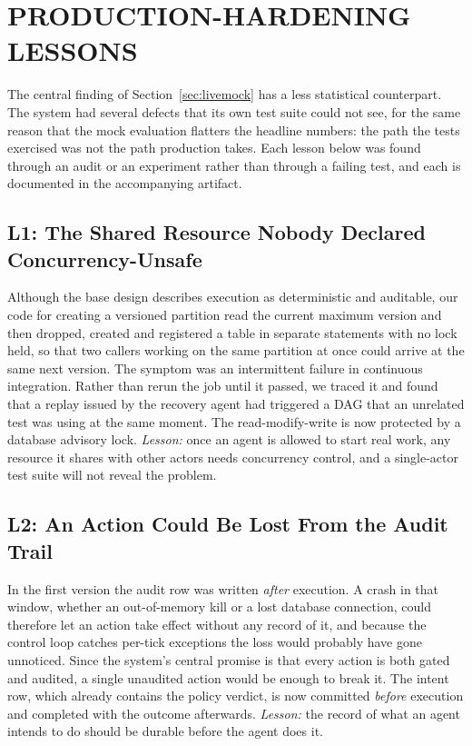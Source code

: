 \section{PRODUCTION-HARDENING LESSONS}\label{sec:lessons}

The central finding of Section~\ref{sec:livemock} has a less statistical counterpart. The system had
several defects that its own test suite could not see, for the same reason that the mock evaluation
flatters the headline numbers: the path the tests exercised was not the path production takes. Each
lesson below was found through an audit or an experiment rather than through a failing test, and each
is documented in the accompanying artifact.

\subsection{L1: The Shared Resource Nobody Declared Concurrency-Unsafe}\label{sec:l1}
Although the base design describes execution as deterministic and auditable, our code for creating a
versioned partition read the current maximum version and then dropped, created and registered a
table in separate statements with no lock held, so that two callers working on the same partition at
once could arrive at the same next version. The symptom was an intermittent failure in continuous
integration. Rather than rerun the job until it passed, we traced it and found that a replay issued by
the recovery agent had triggered a DAG that an unrelated test was using at the same moment. The
read-modify-write is now protected by a database advisory lock. \emph{Lesson:} once an agent is
allowed to start real work, any resource it shares with other actors needs concurrency control, and a
single-actor test suite will not reveal the problem.

\subsection{L2: An Action Could Be Lost From the Audit Trail}\label{sec:l2}
In the first version the audit row was written \emph{after} execution. A crash in that window,
whether an out-of-memory kill or a lost database connection, could therefore let an action take
effect without any record of it, and because the control loop catches per-tick exceptions the loss
would probably have gone unnoticed. Since the system's central promise is that every action is both
gated and audited, a single unaudited action would be enough to break it. The intent row, which
already contains the policy verdict, is now committed \emph{before} execution and completed with the
outcome afterwards. \emph{Lesson:} the record of what an agent intends to do should be durable before
the agent does it.

